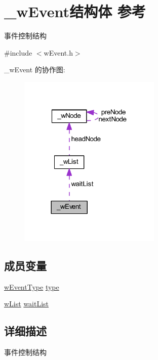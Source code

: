 \hypertarget{struct__w_event}{}\section{\+\_\+w\+Event结构体 参考}
\label{struct__w_event}


事件控制结构  




{\ttfamily \#include $<$w\+Event.\+h$>$}



\+\_\+w\+Event 的协作图\+:
\nopagebreak
\begin{figure}[H]
\begin{center}
\leavevmode
\includegraphics[width=192pt]{struct__w_event__coll__graph}
\end{center}
\end{figure}
\subsection*{成员变量}
\begin{DoxyCompactItemize}
\item 
\mbox{\hyperlink{w_event_8h_ab0672c982196a07535850096d01686c6}{w\+Event\+Type}} \mbox{\hyperlink{struct__w_event_ac98b322cb954407564af85e1cbfe18c2}{type}}
\item 
\mbox{\hyperlink{w_lib_8h_a3f922f977222a1e1fc18bd2ce6d668c3}{w\+List}} \mbox{\hyperlink{struct__w_event_a53d4661687eeb23d08fb0a94ef2918c3}{wait\+List}}
\end{DoxyCompactItemize}


\subsection{详细描述}
事件控制结构 

